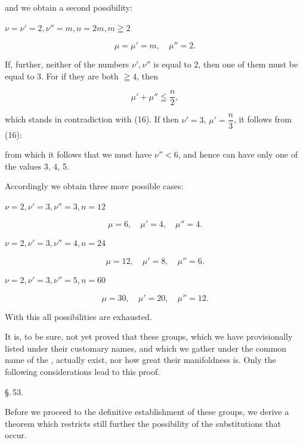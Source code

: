 and we obtain a second possibility:

 $\nu = \nu' = 2, \nu'' = m, n = 2m, m \geqq 2$

\[ \mu = \mu' = m, \quad \mu'' = 2. \]

If, further, neither of the numbers $\nu', \nu''$ is equal to 2, then one of them must be equal to 3. For if they are both $\geqq 4$, then

\[ \mu' + \mu'' \leqq \frac{n}{2}, \]

which stands in contradiction with (16). If then $\nu' = 3$, $\mu' = \dfrac{n}{3}$, it follows from (16):


from which it follows that we must have $\nu'' < 6$, and hence can have only one of the values 3, 4, 5.

Accordingly we obtain three more possible cases:

 $\nu = 2, \nu' = 3, \nu'' = 3, n = 12$

\[ \mu = 6, \quad \mu' = 4, \quad \mu'' = 4. \]

 $\nu = 2, \nu' = 3, \nu'' = 4, n = 24$

\[ \mu = 12, \quad \mu' = 8, \quad \mu'' = 6. \]

 $\nu = 2, \nu' = 3, \nu'' = 5, n = 60$

\[ \mu = 30, \quad \mu' = 20, \quad \mu'' = 12. \]

With this all possibilities are exhausted.

It is, to be sure, not yet proved that these groups, which we have provisionally listed under their customary names, and which we gather under the common name of the , actually exist, nor how great their manifoldness is. Only the following considerations lead to this proof.

\begin{center}
\S.\,53.

\end{center}

Before we proceed to the definitive establishment of these groups, we derive a theorem which restricts still further the possibility of the substitutions that occur.
